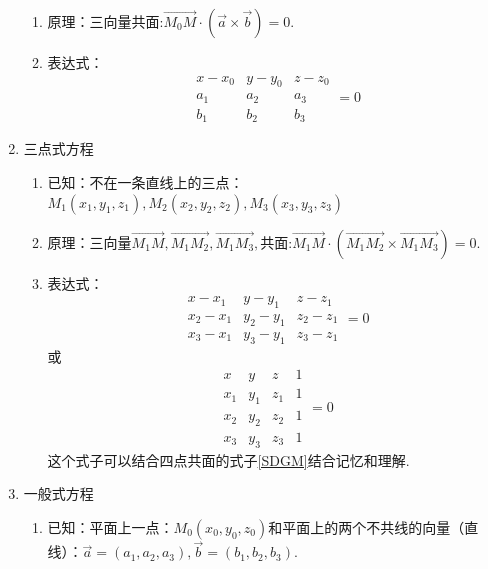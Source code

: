 \begin{enumerate}[\large1.]
\begin{enumerate}[]
		\item 原理：三向量共面:$\overrightarrow{M_0M}\cdot \left( \overrightarrow{a}\times\overrightarrow{b}\right) =0$.
		\item 表达式：
		\begin{equation}
		\begin{array}{|ccc|}
		x-x_0 & y-y_0 & z-z_0 \\
		a_1 & a_2 & a_3 \\
		b_1 & b_2 & b_3
		\end{array}=0
		\label{HLS}
		\end{equation}
	\end{enumerate}
	\item {\color{dy}\large 三点式方程}
	\begin{enumerate}[]
		\item 已知：{\color{dl}不在一条直线上的三点}：$M_1(x_1,y_1,z_1),M_2(x_2,y_2,z_2),M_3(x_3,y_3,z_3)$
		\item 原理：三向量$\overrightarrow{M_1M},\overrightarrow{M_1M_2},\overrightarrow{M_1M_3},$共面:$\overrightarrow{M_1M} \cdot \left( \overrightarrow{M_1M_2}\times\overrightarrow{M_1M_3}\right) =0$.
		\item 表达式：
		\begin{equation}
		\begin{array}{|ccc|}
		x-x_1 & y-y_1 & z-z_1 \\
		x_2-x_1 & y_2-y_1 & z_2-z_1 \\
		x_3-x_1 & y_3-y_1 & z_3-z_1
		\end{array}=0
		\end{equation}
		或
		\begin{equation}
		\begin{array}{|cccc|}
		x & y & z &1\\
		x_1&y_1 &z_1 & 1\\
		x_2& y_2 & z_2& 1\\
		x_3& y_3 & z_3&1
		\end{array}=0
		\end{equation}
		这个式子可以结合四点共面的式子\eqref{SDGM}结合记忆和理解. 
	\end{enumerate}
	\item {\color{dy}\large 一般式方程}
	\begin{enumerate}[]
		\item 已知：{\color{dl}平面上一点}：$M_0(x_0,y_0,z_0)$和平面上的{\color{dl}两个不共线的向量（直线）}：$\overrightarrow{a}=(a_1,a_2,a_3),\overrightarrow{b}=(b_1,b_2,b_3)$.

\end{enumerate}
\end{enumerate}
